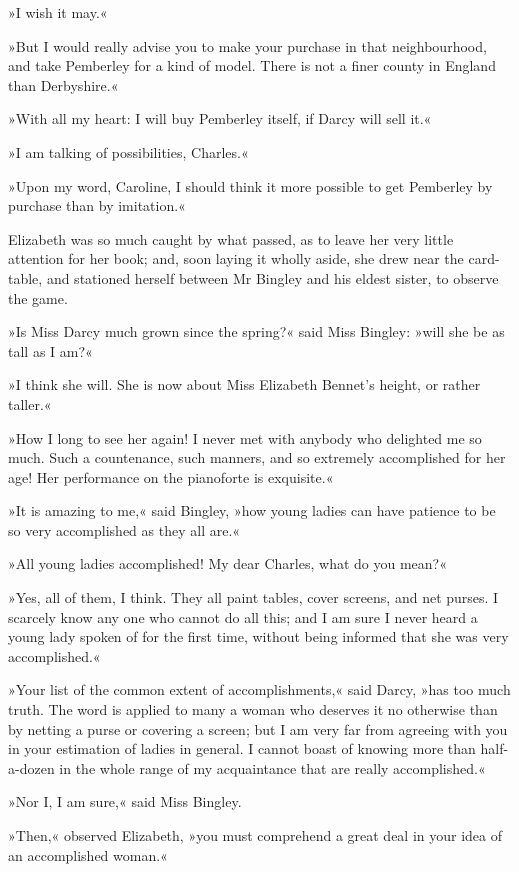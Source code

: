 »I wish it may.«

»But I would really advise you to make your purchase in that neighbourhood, and take Pemberley for a kind of model. There is not a finer county in England than Derbyshire.«

»With all my heart: I will buy Pemberley itself, if Darcy will sell it.«

»I am talking of possibilities, Charles.«

»Upon my word, Caroline, I should think it more possible to get Pemberley by purchase than by imitation.«

Elizabeth was so much caught by what passed, as to leave her very little attention for her book; and, soon laying it wholly aside, she drew near the card-table, and stationed herself between Mr Bingley and his eldest sister, to observe the game.

»Is Miss Darcy much grown since the spring?« said Miss Bingley: »will she be as tall as I am?«

»I think she will. She is now about Miss Elizabeth Bennet's height, or rather taller.«

»How I long to see her again! I never met with anybody who delighted me so much. Such a countenance, such manners, and so extremely accomplished for her age! Her performance on the pianoforte is exquisite.«

»It is amazing to me,« said Bingley, »how young ladies can have patience to be so very accomplished as they all are.«

»All young ladies accomplished! My dear Charles, what do you mean?«

»Yes, all of them, I think. They all paint tables, cover screens, and net purses. I scarcely know any one who cannot do all this; and I am sure I never heard a young lady spoken of for the first time, without being informed that she was very accomplished.«

»Your list of the common extent of accomplishments,« said Darcy, »has too much truth. The word is applied to many a woman who deserves it no otherwise than by netting a purse or covering a screen; but I am very far from agreeing with you in your estimation of ladies in general. I cannot boast of knowing more than half-a-dozen in the whole range of my acquaintance that are really accomplished.«



»Nor I, I am sure,« said Miss Bingley.

»Then,« observed Elizabeth, »you must comprehend a great deal in your idea of an accomplished woman.«

